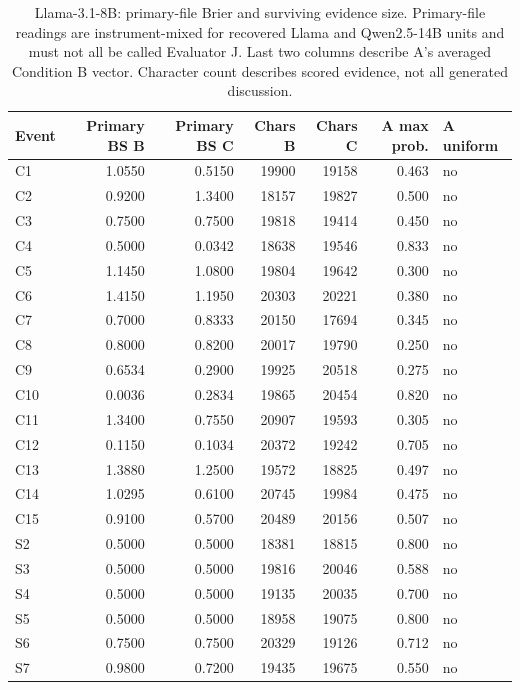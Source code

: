 \begin{table}[!htbp]
\centering\small
\caption{Llama-3.1-8B: primary-file Brier and surviving evidence size. Primary-file readings are instrument-mixed for recovered Llama and Qwen2.5-14B units and must not all be called Evaluator J. Last two columns describe A's averaged Condition B vector. Character count describes scored evidence, not all generated discussion.}
\label{tab:full_primary_llama318b}
\begin{tabular}{lrrrrrl}
\toprule
Event & Primary BS B & Primary BS C & Chars B & Chars C & A max prob. & A uniform \\
\midrule
C1 & 1.0550 & 0.5150 & 19900 & 19158 & 0.463 & no \\
C2 & 0.9200 & 1.3400 & 18157 & 19827 & 0.500 & no \\
C3 & 0.7500 & 0.7500 & 19818 & 19414 & 0.450 & no \\
C4 & 0.5000 & 0.0342 & 18638 & 19546 & 0.833 & no \\
C5 & 1.1450 & 1.0800 & 19804 & 19642 & 0.300 & no \\
C6 & 1.4150 & 1.1950 & 20303 & 20221 & 0.380 & no \\
C7 & 0.7000 & 0.8333 & 20150 & 17694 & 0.345 & no \\
C8 & 0.8000 & 0.8200 & 20017 & 19790 & 0.250 & no \\
C9 & 0.6534 & 0.2900 & 19925 & 20518 & 0.275 & no \\
C10 & 0.0036 & 0.2834 & 19865 & 20454 & 0.820 & no \\
C11 & 1.3400 & 0.7550 & 20907 & 19593 & 0.305 & no \\
C12 & 0.1150 & 0.1034 & 20372 & 19242 & 0.705 & no \\
C13 & 1.3880 & 1.2500 & 19572 & 18825 & 0.497 & no \\
C14 & 1.0295 & 0.6100 & 20745 & 19984 & 0.475 & no \\
C15 & 0.9100 & 0.5700 & 20489 & 20156 & 0.507 & no \\
S2 & 0.5000 & 0.5000 & 18381 & 18815 & 0.800 & no \\
S3 & 0.5000 & 0.5000 & 19816 & 20046 & 0.588 & no \\
S4 & 0.5000 & 0.5000 & 19135 & 20035 & 0.700 & no \\
S5 & 0.5000 & 0.5000 & 18958 & 19075 & 0.800 & no \\
S6 & 0.7500 & 0.7500 & 20329 & 19126 & 0.712 & no \\
S7 & 0.9800 & 0.7200 & 19435 & 19675 & 0.550 & no \\

\end{tabular}
\end{table}

